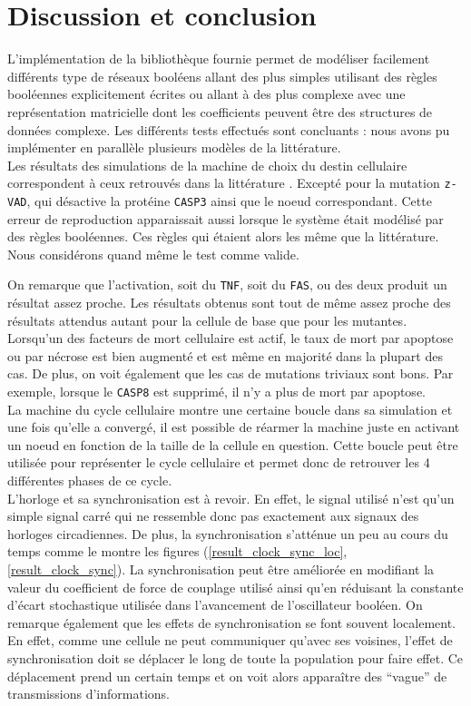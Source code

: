 \documentclass[11pt, a4paper]{article}
\begin{document}
\newpage
\section{Discussion et conclusion}
L'implémentation de la bibliothèque fournie permet de modéliser facilement
différents type de réseaux booléens allant des plus simples utilisant des
règles booléennes explicitement écrites ou allant à des plus complexe avec une
représentation matricielle dont les coefficients peuvent être des structures de
données complexe. Les différents tests effectués sont concluants : nous avons
pu implémenter en parallèle plusieurs modèles de la littérature. \\

Les résultats des simulations de la machine de choix du destin cellulaire
correspondent à ceux retrouvés dans la littérature \cite{calzone2010}. Excepté
pour la mutation \texttt{z-VAD}, qui désactive la protéine \texttt{CASP3} ainsi
que le noeud correspondant. Cette erreur de reproduction apparaissait aussi
lorsque le système était modélisé par des règles booléennes. Ces règles qui
étaient alors les même que la littérature. Nous considérons quand même le test
comme valide.

On remarque que l'activation, soit du \texttt{TNF}, soit du \texttt{FAS}, ou
des deux produit un résultat assez proche. Les résultats obtenus sont tout de
même assez proche des résultats attendus autant pour la cellule de base que
pour les mutantes. Lorsqu'un des facteurs de mort cellulaire est actif, le taux
de mort par apoptose ou par nécrose est bien augmenté et est même en majorité
dans la plupart des cas. De plus, on voit également que les cas de mutations
triviaux sont bons. Par exemple, lorsque le \texttt{CASP8} est supprimé, il n'y
a plus de mort par apoptose. \\

La machine du cycle cellulaire montre une certaine boucle dans sa simulation et
une fois qu'elle a convergé, il est possible de réarmer la machine juste en
activant un noeud en fonction de la taille de la cellule en question. Cette
boucle peut être utilisée pour représenter le cycle cellulaire et permet donc
de retrouver les 4 différentes phases de ce cycle. \\

L'horloge et sa synchronisation est à revoir. En effet, le signal utilisé n'est
qu'un simple signal carré qui ne ressemble donc pas exactement aux signaux des
horloges circadiennes. De plus, la synchronisation s'atténue un peu au cours du
temps comme le montre les figures (\ref{result_clock_sync_loc},
\ref{result_clock_sync}). La synchronisation peut être améliorée en modifiant
la valeur du coefficient de force de couplage utilisé ainsi  qu'en réduisant
la constante d'écart stochastique utilisée dans l'avancement de l'oscillateur
booléen. On remarque également que les effets de synchronisation se font
souvent localement. En effet, comme une cellule ne peut communiquer qu'avec ses
voisines, l'effet de synchronisation doit se déplacer le long de toute la
population pour faire effet. Ce déplacement prend un certain temps et on voit
alors apparaître des ``vague'' de transmissions d'informations. \\
\end{document}
